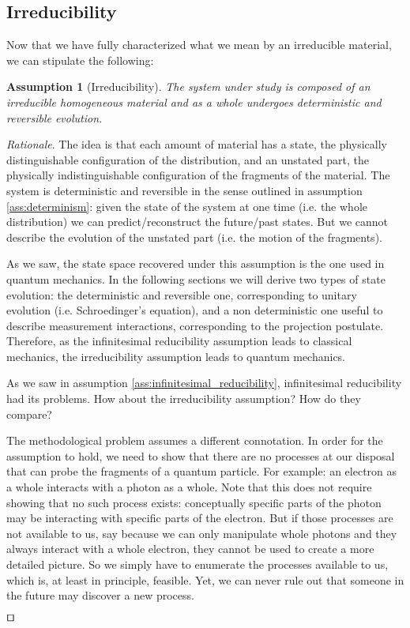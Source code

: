 \documentclass[smallextended]{svjour3}
\numberwithin{equation}{section}
\newenvironment{rationale}{\emph{Rationale}.}{\hfill\(\qed\)}
\newtheorem{assump}{Assumption}
\theoremstyle{definition}
\newenvironment{rationale}{\emph{Rationale}.}{\qed}
\begin{document}
\subsection{Irreducibility}

Now that we have fully characterized what we mean by an irreducible material, we can stipulate the following:

\begin{assump}[Irreducibility]\label{ass:irreducibility}
	The system under study is composed of an irreducible homogeneous material and as a whole undergoes deterministic and reversible evolution.
\end{assump}

\begin{rationale}
	The idea is that each amount of material has a state, the physically distinguishable configuration of the distribution, and an unstated part, the physically indistinguishable configuration of the fragments of the material. The system is deterministic and reversible in the sense outlined in assumption \ref{ass:determinism}: given the state of the system at one time (i.e. the whole distribution) we can predict/reconstruct the future/past states. But we cannot describe the evolution of the unstated part (i.e. the motion of the fragments).
	
	As we saw, the state space recovered under this assumption is the one used in quantum mechanics. In the following sections we will derive two types of state evolution: the deterministic and reversible one, corresponding to unitary evolution (i.e.  Schroedinger's equation), and a non deterministic one useful to describe measurement interactions, corresponding to the projection postulate. Therefore, as the infinitesimal reducibility assumption leads to classical mechanics, the irreducibility assumption leads to quantum mechanics.
	
	As we saw in assumption \ref{ass:infinitesimal_reducibility}, infinitesimal reducibility had its problems. How about the irreducibility assumption? How do they compare?
	
	The methodological problem assumes a different connotation. In order for the assumption to hold, we need to show that there are no processes at our disposal that can probe the fragments of a quantum particle. For example: an electron as a whole interacts with a photon as a whole. Note that this does not require showing that no such process exists: conceptually specific parts of the photon may be interacting with specific parts of the electron. But if those processes are not available to us, say because we can only manipulate whole photons and they always interact with a whole electron, they cannot be used to create a more detailed picture. So we simply have to enumerate the processes available to us, which is, at least in principle, feasible. Yet, we can never rule out that someone in the future may discover a new process.


\end{rationale}
\end{document}
